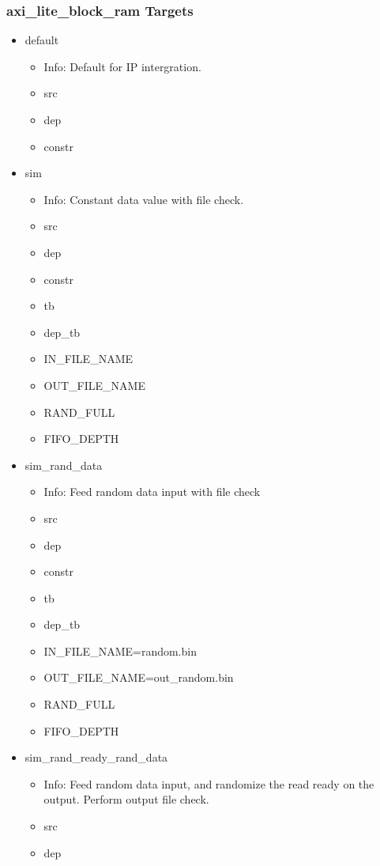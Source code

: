 \subsubsection{axi\_lite\_block\_ram Targets}
\begin{itemize}
\item default
	\begin{itemize}
	\item[$\space$] Info: Default for IP intergration.
	\item src
	\item dep
	\item constr
	\end{itemize}
\item sim
	\begin{itemize}
	\item[$\space$] Info: Constant data value with file check.
	\item src
	\item dep
	\item constr
	\item tb
	\item dep\_tb
	\item IN\_FILE\_NAME
	\item OUT\_FILE\_NAME
	\item RAND\_FULL
	\item FIFO\_DEPTH
	\end{itemize}
\item sim\_rand\_data
	\begin{itemize}
	\item[$\space$] Info: Feed random data input with file check
	\item src
	\item dep
	\item constr
	\item tb
	\item dep\_tb
	\item IN\_FILE\_NAME=random.bin
	\item OUT\_FILE\_NAME=out\_random.bin
	\item RAND\_FULL
	\item FIFO\_DEPTH
	\end{itemize}
\item sim\_rand\_ready\_rand\_data
	\begin{itemize}
	\item[$\space$] Info: Feed random data input, and randomize the read ready on the output. Perform output file check.
	\item src
	\item dep

\end{itemize}
\end{itemize}
